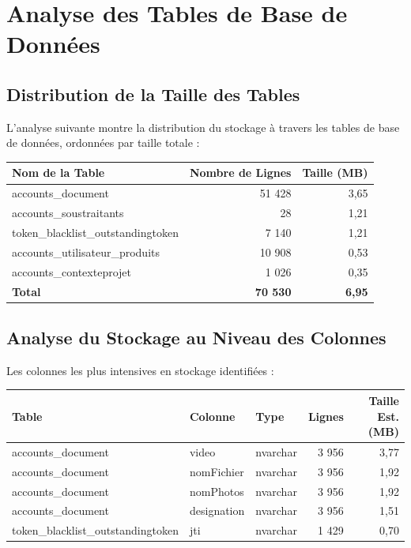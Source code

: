 \documentclass[12pt,a4paper]{article}
\begin{document}
\section{Analyse des Tables de Base de Données}

\subsection{Distribution de la Taille des Tables}

L'analyse suivante montre la distribution du stockage à travers les tables de base de données, ordonnées par taille totale :

\begin{longtable}{|l|r|r|}
\hline
\textbf{Nom de la Table} & \textbf{Nombre de Lignes} & \textbf{Taille (MB)} \\
\hline
\endhead
accounts\_document & 51 428 & 3,65 \\
\hline
accounts\_soustraitants & 28 & 1,21 \\
\hline
token\_blacklist\_outstandingtoken & 7 140 & 1,21 \\
\hline
accounts\_utilisateur\_produits & 10 908 & 0,53 \\
\hline
accounts\_contexteprojet & 1 026 & 0,35 \\
\hline
\textbf{Total} & \textbf{70 530} & \textbf{6,95} \\
\hline
\end{longtable}

\subsection{Analyse du Stockage au Niveau des Colonnes}

Les colonnes les plus intensives en stockage identifiées :

\begin{longtable}{|l|l|l|r|r|}
\hline
\textbf{Table} & \textbf{Colonne} & \textbf{Type} & \textbf{Lignes} & \textbf{Taille Est. (MB)} \\
\hline
\endhead
accounts\_document & video & nvarchar & 3 956 & 3,77 \\
\hline
accounts\_document & nomFichier & nvarchar & 3 956 & 1,92 \\
\hline
accounts\_document & nomPhotos & nvarchar & 3 956 & 1,92 \\
\hline
accounts\_document & designation & nvarchar & 3 956 & 1,51 \\
\hline
token\_blacklist\_outstandingtoken & jti & nvarchar & 1 429 & 0,70 \\
\hline
\end{longtable}
\end{document}
